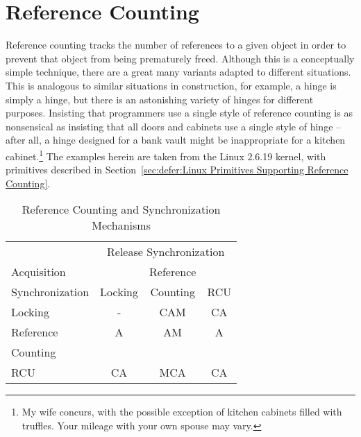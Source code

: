 
\section{Reference Counting}
\label{sec:defer:Reference Counting}

Reference counting tracks the number of references
to a given object in order to prevent that object from being prematurely
freed.
Although this is a conceptually simple technique, there are a great
many variants adapted to different situations.
This is analogous to similar situations in construction, for example,
a hinge is simply a hinge, but there is an astonishing variety
of hinges for different purposes.
Insisting that programmers use a single style of reference counting
is as nonsensical as insisting that all doors and cabinets use a single
style of hinge -- after all, a hinge designed for a bank vault might
be inappropriate for a kitchen cabinet.\footnote{
	My wife concurs, with the possible exception of kitchen
	cabinets filled with truffles.
	Your mileage with your own spouse may vary.}
The examples herein are taken from the Linux 2.6.19 kernel,
with primitives described in
Section~\ref{sec:defer:Linux Primitives Supporting Reference Counting}.

\begin{table}
\centering
\begin{tabular}{l||c|c|c}
	& \multicolumn{3}{c}{Release Synchronization} \\
	\cline{2-4}
	Acquisition     &         & Reference &     \\
	Synchronization & Locking & Counting  & RCU \\
	\hline
	\hline
	Locking		& -	  & CAM	      & CA  \\
	\hline
	Reference	& A	  & AM	      & A   \\
	Counting	&  	  &   	      &     \\
	\hline
	RCU		& CA	  & MCA	      & CA  \\
\end{tabular}
\caption{Reference Counting and Synchronization Mechanisms}
\label{tab:defer:Reference Counting and Synchronization Mechanisms}
\end{table}

